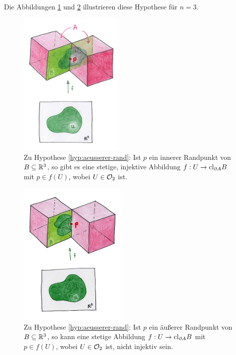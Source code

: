     Die Abbildungen \ref{fig:pflasterbild-innerer-rp} und \ref{fig:pflasterbild-aeusserer-rp} illustrieren diese Hypothese für $n=3$.
    \begin{figure}[ht]
        \centering
        \includegraphics[height=7cm]{abb/pflasterbild-innerer-rp.png}
        \caption[Zu Hypothese \ref{hyp:aeusserer-rand} (innerer Randpunkt)]{Zu Hypothese \ref{hyp:aeusserer-rand}: Ist $p$ ein innerer Randpunkt von $B \subseteq \mathbb{R}^3$, so gibt es eine stetige, injektive Abbildung $f:U \to \text{cl}_{\partial A} B$ mit $p \in f(U)$, wobei $U \in \mathcal{O}_2$ ist.}
        \label{fig:pflasterbild-innerer-rp}
    \end{figure}

    \begin{figure}[ht]
        \centering
        \includegraphics[height=7cm]{abb/pflasterbild-aeusserer-rp.png}
        \caption[Zu Hypothese \ref{hyp:aeusserer-rand} (äußerer Randpunkt)]{Zu Hypothese \ref{hyp:aeusserer-rand}: Ist $p$ ein äußerer Randpunkt von $B \subseteq \mathbb{R}^3$, so kann eine stetige Abbildung $f:U \to \text{cl}_{\partial A} B$ mit $p \in f(U)$, wobei $U \in \mathcal{O}_2$ ist, nicht injektiv sein.}
        \label{fig:pflasterbild-aeusserer-rp}
    \end{figure}
    
